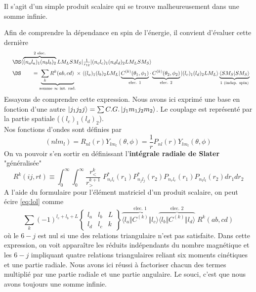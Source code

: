 Il s'agit d'un simple produit scalaire qui se trouve malheureusement dans une somme infinie.

\newpage
Afin de comprendre la dépendance en spin de l'énergie, il convient d'évaluer cette dernière
\begin{equation}
\begin{array}{ll}
&\DS \langle \overbrace{(n_a l_a)_1 (n_b l_b)_2}^{\text{2 elec.}} LM_L S M_S \vert \frac{1}{r_{12}} \vert (n_c l_c)_1 (n_d l_d)_2 LM_L S M_S \rangle\vspace{2mm}\\
&\DS\qquad = \underbrace{\sum_k R^k (ab, cd)}_{\text{somme $\infty$ int. rad.}} \times \; \langle ( l_a)_1 (l_b)_2 LM_L  \vert\underbrace{ C^{(k)} (\theta_1, \phi_1)}_{\text{elec. 1}} \cdot 
\underbrace{C^{(k)} (\theta_2, \phi_2)}_{\text{elec. 2}}
   \vert ( l_c)_1 ( l_d)_2 LM_L  \rangle \underbrace{\langle S M_S \vert S M_S \rangle}_{1 \text{ (indep. spin)}}
\end{array}
\label{eq:lol}
\end{equation}
Essayons de comprendre cette expression. Nous avons ici exprimé une base en fonction d'une autre
$\ket{j_1 j_2 j} = \sum C.G. \ket{j_1 m_1 j_2 m_2}$. Le couplage est représenté par la partie
spatiale ($(l_c)_1(l_d)_2$).\\

Nos fonctions d'ondes sont définies par
\begin{equation}
(n l m_l )=
R_{n l} (r) Y_{l m_{l}} (\theta, \phi )
= \frac{1}{r} 
P_{n l} (r) Y_{l m_{l}} (\theta, \phi )
\end{equation}
On va pouvoir s'en sortir en définissant l'\textbf{intégrale radiale de Slater} "généralisée"
\begin{equation}
R^k(ij,rt) \equiv
\int_0^\infty \int_0^\infty  \!
\frac{r_<^k}{r_>^{k+1}} \; P^\ast_{n_i l_i} (r_1) P^\ast_{n_j l_j} (r_2)
P_{n_r l_r} (r_1) P_{n_t l_t} (r_2) dr_1 dr_2
\end{equation}
A l'aide du formulaire pour l'élément matriciel d'un produit scalaire, on peut écire \eqref{eq:lol} 
comme
\begin{equation}
\sum_k  
(-1)^{l_c + l_b + L } \left\{ \begin{array}{ccc} l_a & l_b & L \\ l_d & l_c & k \end{array} \right\}
\overbrace{\langle l_a \Vert C^{(k)} \Vert l_c \rangle}^{\text{elec. 1}}
\overbrace{\langle l_b \Vert C^{(k)} \Vert l_d \rangle}^{\text{elec. 2}}  \;  R^k (ab, cd)
\end{equation}
où le $6-j$ est nul si une des relations triangulaire n'est pas satisfaite. Dans cette expression, 
on voit apparaître les réduits indépendants du nombre magnétique et les $6-j$ impliquant quatre
relations triangulaires reliant six moments cinétiques et une partie radiale. Nous avons ici réussi
à factoriser chacun des termes multiplié par une partie radiale et une partie angulaire. Le souci, 
c'est que nous avons toujours une somme infinie.
 
